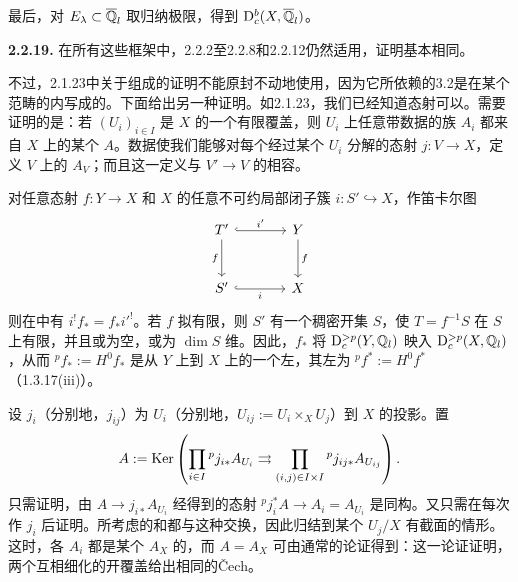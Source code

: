 最后，对 $E_\lambda\subset\overline{\mathbb Q}_l$ 取归纳极限，得到 $\mathrm{D}_c^b(X,\overline{\mathbb Q}_l)$。

\par\medskip\noindent\textbf{2.2.19.} 在所有这些框架中，2.2.2至2.2.8和2.2.12仍然适用，证明基本相同。

不过，2.1.23中关于组成的证明不能原封不动地使用，因为它所依赖的3.2是在某个范畴的内写成的。下面给出另一种证明。如2.1.23，我们已经知道态射可以。需要证明的是：若 $(U_i)_{i\in I}$ 是 $X$ 的一个有限覆盖，则 $U_i$ 上任意带数据的族 $A_i$
都来自 $X$ 上的某个 $A$。数据使我们能够对每个经过某个 $U_i$ 分解的态射 $j\colon V\to X$，定义 $V$ 上的 $A_V$；而且这一定义与 $V'\to V$ 的相容。

对任意态射 $f\colon Y\to X$ 和 $X$ 的任意不可约局部闭子簇 $i\colon S'\hookrightarrow X$，作笛卡尔图
\[
 \begin{tikzcd}[ampersand replacement=\&,column sep=large,row sep=large]
 T'\arrow[r,hook,"{i'}"]\arrow[d,"{f}"']\&Y\arrow[d,"{f}"]\\
 S'\arrow[r,hook,"{i}"']\&X
 \end{tikzcd}
\]
则在中有 $i^!f_*=f_*i'^!$。若 $f$ 拟有限，则 $S'$ 有一个稠密开集 $S$，使 $T=f^{-1}S$ 在 $S$ 上有限，并且或为空，或为 $\dim S$ 维。因此，$f_*$ 将 $\mathrm{D}_c^{>p}(Y,\mathbb Q_l)$ 映入 $\mathrm{D}_c^{>p}(X,\mathbb Q_l)$，从而 ${}^pf_*:=H^0f_*$ 是从 $Y$ 上到 $X$ 上的一个左，其左为 ${}^pf^*:=H^0f^*$（1.3.17(iii)）。

设 $j_i$（分别地，$j_{ij}$）为 $U_i$（分别地，$U_{ij}:=U_i\times_XU_j$）到 $X$ 的投影。置
\[
 A:=\operatorname{Ker}\left(\prod_{i\in I}{}^pj_{i*}A_{U_i}
 \rightrightarrows\prod_{(i,j)\in I\times I}{}^pj_{ij*}A_{U_{ij}}\right).
\]
只需证明，由 $A\to j_{i*}A_{U_i}$ 经得到的态射 ${}^pj_i^*A\to A_i=A_{U_i}$ 是同构。又只需在每次作 $j_i$ 后证明。所考虑的和都与这种交换，因此归结到某个 $U_j/X$ 有截面的情形。这时，各 $A_i$ 都是某个 $A_X$ 的，而 $A=A_X$ 可由通常的论证得到：这一论证证明，两个互相细化的开覆盖给出相同的Čech。
